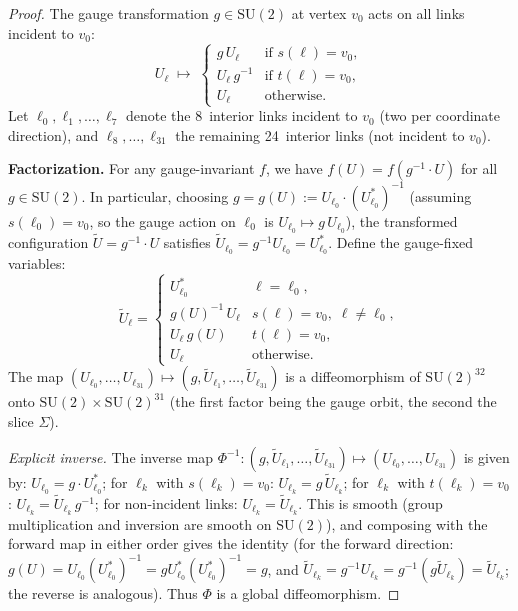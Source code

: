 \documentclass[11pt]{article}
\theoremstyle{definition}
\newcommand{\SU}{\mathrm{SU}}
\begin{document}
\begin{proof}
The gauge transformation $g\in\SU(2)$ at vertex $v_0$ acts on
all links incident to $v_0$:
\begin{equation}\label{eq:gauge-action-full}
U_\ell\;\longmapsto\;
\begin{cases}
g\,U_\ell & \text{if }s(\ell)=v_0,\\
U_\ell\,g^{-1} & \text{if }t(\ell)=v_0,\\
U_\ell & \text{otherwise}.
\end{cases}
\end{equation}
Let $\ell_0,\ell_1,\ldots,\ell_7$ denote the 8~interior links incident
to $v_0$ (two per coordinate direction), and
$\ell_8,\ldots,\ell_{31}$ the remaining 24~interior links (not
incident to $v_0$).

\textbf{Factorization.}
For any gauge-invariant $f$, we have
$f(U)=f(g^{-1}\cdot U)$ for all $g\in\SU(2)$.
In particular, choosing $g=g(U):=U_{\ell_0}\cdot(U_{\ell_0}^*)^{-1}$
(assuming $s(\ell_0)=v_0$, so the gauge action on $\ell_0$ is
$U_{\ell_0}\mapsto g\,U_{\ell_0}$), the transformed configuration
$\widetilde{U}=g^{-1}\cdot U$ satisfies
$\widetilde{U}_{\ell_0}=g^{-1}U_{\ell_0}=U_{\ell_0}^*$.
Define the gauge-fixed variables:
\begin{equation}
\widetilde{U}_\ell=
\begin{cases}
U_{\ell_0}^* & \ell=\ell_0,\\
g(U)^{-1}\,U_\ell & s(\ell)=v_0,\;\ell\ne\ell_0,\\
U_\ell\,g(U) & t(\ell)=v_0,\\
U_\ell & \text{otherwise}.
\end{cases}
\end{equation}
The map $(U_{\ell_0},\ldots,U_{\ell_{31}})\mapsto
(g,\widetilde{U}_{\ell_1},\ldots,\widetilde{U}_{\ell_{31}})$
is a diffeomorphism of $\SU(2)^{32}$ onto $\SU(2)\times\SU(2)^{31}$
(the first factor being the gauge orbit, the second the slice
$\Sigma$).

\emph{Explicit inverse.}
The inverse map $\Phi^{-1}:(g,\widetilde{U}_{\ell_1},\ldots,
\widetilde{U}_{\ell_{31}})\mapsto(U_{\ell_0},\ldots,U_{\ell_{31}})$
is given by:
$U_{\ell_0}=g\cdot U_{\ell_0}^*$;
for $\ell_k$ with $s(\ell_k)=v_0$: $U_{\ell_k}=g\,\widetilde{U}_{\ell_k}$;
for $\ell_k$ with $t(\ell_k)=v_0$: $U_{\ell_k}=\widetilde{U}_{\ell_k}\,g^{-1}$;
for non-incident links: $U_{\ell_k}=\widetilde{U}_{\ell_k}$.
This is smooth (group multiplication and inversion are smooth on
$\SU(2)$), and composing with the forward map in either order gives
the identity (for the forward direction:
$g(U)=U_{\ell_0}(U_{\ell_0}^*)^{-1}=gU_{\ell_0}^*(U_{\ell_0}^*)^{-1}=g$,
and $\widetilde{U}_{\ell_k}=g^{-1}U_{\ell_k}
=g^{-1}(g\widetilde{U}_{\ell_k})=\widetilde{U}_{\ell_k}$; the reverse
is analogous).  Thus $\Phi$ is a global diffeomorphism.


\end{proof}
\end{document}
